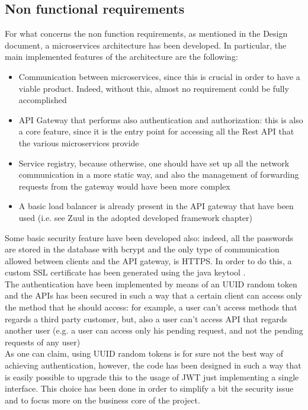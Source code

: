 \subsection{Non functional requirements}
For what concerns the non function requirements, as mentioned in the Design document, a microservices architecture has been developed. 
In particular, the main implemented features of the architecture are the following: 
\begin{itemize}
\item Communication between microservices, since this is crucial in order to have a viable product. Indeed, without this, almost no
requirement could be fully accomplished
\item API Gateway that performs also authentication and authorization: this is also a core feature, since it is the entry point for accessing
all the Rest API that the various microservices provide
\item Service registry, because otherwise, one should have set up all the network communication in a more static way, and also the management
of forwarding requests from the gateway would have been more complex 
\item A basic load balancer is already present in the API gateway that have been used (i.e. see Zuul in the adopted developed framework 
chapter)
\end{itemize}

\par Some basic security feature have been developed also: indeed, all the passwords are stored in the database with bcrypt and the only type
of communication allowed between clients and the API gateway, is HTTPS. In order to do this, a custom SSL certificate has been
generated using the java keytool \cite{httpstool}.
\\
The authentication have been implemented by means of an UUID random token and the APIs has been secured in such a way that a certain client
can access only the method that he should access: for example, a user can't access methods that regards a third party customer, but, also
a user can't access API that regards another user (e.g. a user can access only his pending request, and not the pending requests of any
user) \\
As one can claim, using UUID random tokens is for sure not the best way of achieving authentication, however, the code has been designed
in such a way that is easily possible to upgrade this to the usage of JWT just implementing a single interface. This choice
has been done in order to simplify a bit the security issue and to focus more on the business core of the project. 

